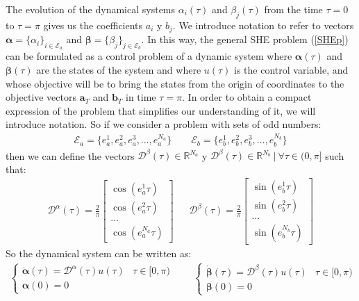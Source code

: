 The evolution of the dynamical systems $ \alpha_i (\tau) $ and $ \beta_j (\tau) $ from the time $ \tau = 0 $ to $ \tau = \pi $ gives us the coefficients $ a_i $ y $ b_j $.
%
We introduce notation to refer to vectors $\bm{\alpha} = \{\alpha_i\}_{i\in\mathcal{E}_a}$ and $\bm{\beta} = \{\beta_j\}_{j\in\mathcal{E}_b}$.
%
In this way, the general SHE problem (\ref{SHEp}) can be formulated as a control problem of a dynamic system where $ \bm{\alpha} (\tau) $ and $ \bm{\beta} (\tau ) $ are the states of the system and where $ u (\tau) $ is the control variable, and whose objective will be to bring the states from the origin of coordinates to the objective vectors $ \bm{a} _T $ and $ \bm{b} _T $ in time $ \tau = \pi $.
%
In order to obtain a compact expression of the problem that simplifies our understanding of it, we will introduce notation.
%
So if we consider a problem with sets of odd numbers:
\begin{gather}
    \mathcal{E}_a = \{e_a^1,e_a^2,e_a^3,\dots,e_a^{N_a}\} \hspace{2em} \mathcal{E}_b = \{e_b^1,e_b^2,e_b^3,\dots,e_b^{N_b}\}    
\end{gather}
%
then we can define the vectors $\bm{\mathcal{D}}^\beta(\tau) \in \mathbb{R}^{N_a} $ y $ \bm{\mathcal{D}}^\beta(\tau) \in \mathbb{R}^{N_b} \ | \ \forall \tau \in (0,\pi]$ such that:
\begin{gather}
    \bm{\mathcal{D}}^\alpha(\tau) = 
    \frac{2}{\pi}
        \begin{bmatrix} 
        \cos(e_a^1\tau) \\
        \cos(e_a^2\tau) \\
        \dots           \\
        \cos(e_a^{N_a}\tau) 
    \end{bmatrix} \ \ \text{  }  \ \ 
    \bm{\mathcal{D}}^\beta(\tau) = 
    \frac{2}{\pi}
    \begin{bmatrix} 
    \sin(e_b^1\tau) \\
    \sin(e_b^2\tau) \\
    \dots           \\
    \sin(e_b^{N_b}\tau) 
    \end{bmatrix} 
\end{gather}
%
So the dynamical system can be written as:
\begin{gather}
    \begin{cases}
        \dot{\bm{\alpha}}(\tau) = \bm{\mathcal{D}}^\alpha(\tau) u(\tau) & \tau \in [0,\pi)\\
        \bm{\alpha}(0) = 0
    \end{cases} \hspace{2em}
    \begin{cases}
        \dot{\bm{\beta}}(\tau)  = \bm{\mathcal{D}}^\beta(\tau) u(\tau) & \tau \in [0,\pi) \\
        \bm{\beta}(0) = 0
    \end{cases}
\end{gather}
